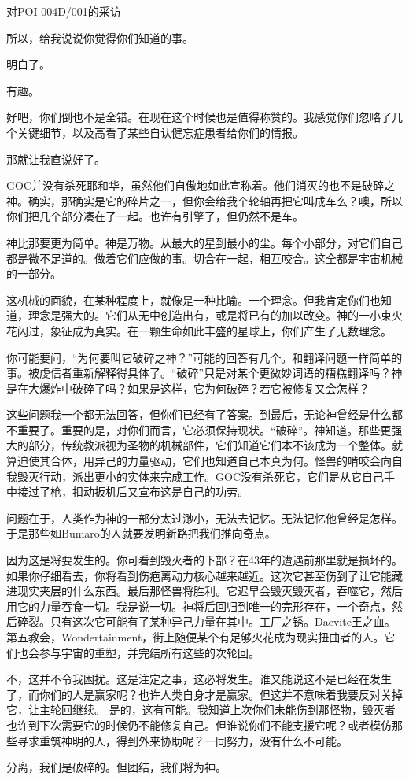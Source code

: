 对POI-004D/001的采访 \\

\begin{scpbox}

所以，给我说说你觉得你们知道的事。

明白了。

有趣。

好吧，你们倒也不是全错。在现在这个时候也是值得称赞的。我感觉你们忽略了几个关键细节，以及高看了某些自认健忘症患者给你们的情报。

那就让我直说好了。

GOC并没有杀死耶和华，虽然他们自傲地如此宣称着。他们消灭的也不是破碎之神。确实，那确实是它的碎片之一，但你会给我个轮轴再把它叫成车么？噢，所以你们把几个部分凑在了一起。也许有引擎了，但仍然不是车。

神比那要更为简单。神是万物。从最大的星到最小的尘。每个小部分，对它们自己都是微不足道的。做着它们应做的事。切合在一起，相互咬合。这全都是宇宙机械的一部分。

这机械的面貌，在某种程度上，就像是一种比喻。一个理念。但我肯定你们也知道，理念是强大的。它们从无中创造出有，或是将已有的加以改变。神的一小束火花闪过，象征成为真实。在一颗生命如此丰盛的星球上，你们产生了无数理念。

你可能要问，“为何要叫它破碎之神？”可能的回答有几个。和翻译问题一样简单的事。被虔信者重新解释得具体了。“破碎”只是对某个更微妙词语的糟糕翻译吗？神是在大爆炸中破碎了吗？如果是这样，它为何破碎？若它被修复又会怎样？

这些问题我一个都无法回答，但你们已经有了答案。到最后，无论神曾经是什么都不重要了。重要的是，对你们而言，它必须保持现状。“破碎”。神知道。那些更强大的部分，传统教派视为圣物的机械部件，它们知道它们本不该成为一个整体。就算迫使其合体，用异己的力量驱动，它们也知道自己本真为何。怪兽的啃咬会向自我毁灭行动，派出更小的实体来完成工作。GOC没有杀死它，它们是从它自己手中接过了枪，扣动扳机后又宣布这是自己的功劳。

问题在于，人类作为神的一部分太过渺小，无法去记忆。无法记忆他曾经是怎样。于是那些如Bumaro的人就要发明新路把我们推向奇点。

因为这是将要发生的。你可看到毁灭者的下部？在43年的遭遇前那里就是损坏的。如果你仔细看去，你将看到伤疤离动力核心越来越近。这次它甚至伤到了让它能藏进现实夹层的什么东西。最后那怪兽将胜利。它迟早会毁灭毁灭者，吞噬它，然后用它的力量吞食一切。我是说一切。神将后回归到唯一的完形存在，一个奇点，然后碎裂。只有这次它可能有了某种异己力量在其中。工厂之锈。Daevite王之血。第五教会，Wondertainment，街上随便某个有足够火花成为现实扭曲者的人。它们也会参与宇宙的重塑，并完结所有这些的次轮回。

不，这并不令我困扰。这是注定之事，这必将发生。谁又能说这不是已经在发生了，而你们的人是赢家呢？也许人类自身才是赢家。但这并不意味着我要反对关掉它，让主轮回继续。
是的，这有可能。我知道上次你们未能伤到那怪物，毁灭者也许到下次需要它的时候仍不能修复自己。但谁说你们不能支援它呢？或者模仿那些寻求重筑神明的人，得到外来协助呢？一同努力，没有什么不可能。

分离，我们是破碎的。但团结，我们将为神。

\end{scpbox}
